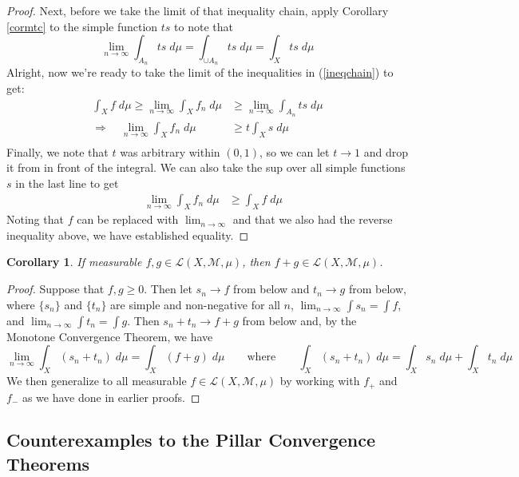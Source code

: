 \documentclass[12pt]{article}
\theoremstyle{plain}
\newtheorem{cor}[thm]{Corollary}
\theoremstyle{definition}
\theoremstyle{remark}
\begin{document}
\begin{proof}
Next, before we take the limit of that inequality chain, apply Corollary \ref{cormtc} to the simple function $ts$ to note that 
\[
    \lim_{n\rightarrow\infty} \int_{A_n} ts \; d\mu
    = \int_{\cup A_n} ts \;d\mu
    = \int_{X} ts \;d\mu
\]
Alright, now we're ready to take the limit of the inequalities in (\ref{ineqchain}) to get:
\begin{align*}
    \int_X f\;d\mu \geq \lim_{n\rightarrow\infty}
    \int_X f_n\;d\mu &\geq
     \lim_{n\rightarrow\infty}\int_{A_n} ts \;d\mu \\
    \Rightarrow \quad\lim_{n\rightarrow\infty}
    \int_X f_n\;d\mu &\geq
     t\int_{X} s \;d\mu \\
\end{align*}
Finally, we note that $t$ was arbitrary within $(0,1)$, so we can let $t\rightarrow 1$ and drop it from in front of the integral. We can also take the sup over all simple functions $s$ in the last line to get
\begin{align*}
     \quad\lim_{n\rightarrow\infty}
    \int_X f_n\;d\mu &\geq
    \int_{X} f \;d\mu 
\end{align*}
Noting that $f$ can be replaced with $\lim_{n\rightarrow\infty}$ and that we also had the reverse inequality above, we have established equality.

\end{proof}

\begin{cor} If measurable $f,g\in\mathscr{L}(X,\mathscr{M},\mu)$, then $f+g\in\mathscr{L}(X,\mathscr{M},\mu)$.
\end{cor} 
\begin{proof}
    Suppose that $f,g\geq 0$. Then let $s_n{\rightarrow} f$ from below and $t_n{\rightarrow} g$ from below, where $\{s_n\}$ and $\{t_n\}$ are simple and non-negative for all $n$, $\lim_{n\rightarrow\infty}\int s_n = \int f$, and $\lim_{n\rightarrow\infty}\int t_n=\int g$. Then $s_n+t_n\rightarrow f+g$ from below and, by the Monotone Convergence Theorem, we have 
\[
    \lim_{n\rightarrow\infty}   
    \int_X (s_n+t_n)\;d\mu = \int_X (f+g)\;d\mu 
    \qquad \text{where}\qquad
    \int_X (s_n + t_n)\;d\mu
    = \int_X s_n \;d\mu+ \int_X t_n\;d\mu
\]
We then generalize to all measurable $f\in\mathscr{L}(X,\mathscr{M},\mu)$ by working with $f_+$ and $f_-$ as we have done in earlier proofs.
\end{proof}


\subsection{Counterexamples to the Pillar Convergence Theorems}
\end{document}

